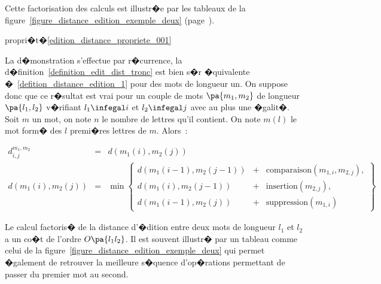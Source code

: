 Cette factorisation des calculs est illustr�e par les tableaux de la figure~\ref{figure_distance_edition_exemple_deux}
(page~\pageref{figure_distance_edition_exemple_deux}).



\begin{xdemo}{propri�t�}{\ref{edition_distance_propriete_001}}

La d�monstration s'effectue par r�currence, la d�finition~\ref{definition_edit_dist_tronc} est bien s�r �quivalente �~\ref{defition_distance_edition_1} pour des mots de longueur un. On suppose donc que ce r�sultat est vrai pour un couple de mots $\pa{m_1,m_2}$ de longueur $\pa{l_1,l_2}$ v�rifiant $l_1 \infegal i$ et $l_2 \infegal j$ avec au plus une �galit�. Soit $m$ un mot, on note $n$ le nombre de lettres qu'il contient. On note  $m\left(  l\right)  $ le mot form� des $l$ premi�res lettres de $m$. Alors~:

    \begin{eqnarray*}
    d_{i,j}^{m_{1},m_{2}} &=& d\left(  m_{1}\left( i\right) ,m_{2}\left( j\right)  \right)\\
    d\left(  m_{1}\left(  i\right)  ,m_{2}\left( j\right) \right)  &=&
        \min\left\{
                \begin{array}{lll}%
                d\left(  m_{1}\left(  i-1\right)  ,m_{2}\left(  j-1\right)  \right)
                		&	+	& \text{comparaison}\left(  m_{1,i},m_{2,j}\right), \\
                d\left(  m_{1}\left(  i\right)  ,m_{2}\left(  j-1\right)  \right)
                		&	+	& \text{insertion}\left(  m_{2,j}\right), \\
                d\left(  m_{1}\left(  i-1\right)  ,m_{2}\left(  j\right)  \right) 
                		&	+	& \text{suppression}\left(  m_{1,i}\right)
                \end{array}
            \right\}
    \end{eqnarray*}

\end{xdemo}

Le calcul factoris� de la distance d'�dition entre deux mots de longueur $l_1$ et $l_2$ a un co�t de l'ordre $O\pa{l_1 l_2}$. Il est souvent illustr� par un tableau comme celui de la figure~\ref{figure_distance_edition_exemple_deux} qui permet �galement de retrouver la meilleure s�quence d'op�rations permettant de passer du premier mot au second.




